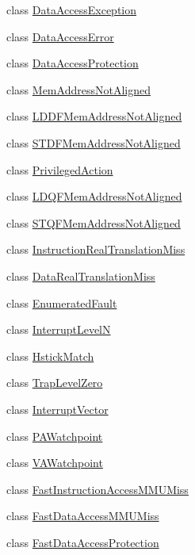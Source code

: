 \begin{DoxyCompactItemize}
\item 
class \hyperlink{classSparcISA_1_1DataAccessException}{DataAccessException}
\item 
class \hyperlink{classSparcISA_1_1DataAccessError}{DataAccessError}
\item 
class \hyperlink{classSparcISA_1_1DataAccessProtection}{DataAccessProtection}
\item 
class \hyperlink{classSparcISA_1_1MemAddressNotAligned}{MemAddressNotAligned}
\item 
class \hyperlink{classSparcISA_1_1LDDFMemAddressNotAligned}{LDDFMemAddressNotAligned}
\item 
class \hyperlink{classSparcISA_1_1STDFMemAddressNotAligned}{STDFMemAddressNotAligned}
\item 
class \hyperlink{classSparcISA_1_1PrivilegedAction}{PrivilegedAction}
\item 
class \hyperlink{classSparcISA_1_1LDQFMemAddressNotAligned}{LDQFMemAddressNotAligned}
\item 
class \hyperlink{classSparcISA_1_1STQFMemAddressNotAligned}{STQFMemAddressNotAligned}
\item 
class \hyperlink{classSparcISA_1_1InstructionRealTranslationMiss}{InstructionRealTranslationMiss}
\item 
class \hyperlink{classSparcISA_1_1DataRealTranslationMiss}{DataRealTranslationMiss}
\item 
class \hyperlink{classSparcISA_1_1EnumeratedFault}{EnumeratedFault}
\item 
class \hyperlink{classSparcISA_1_1InterruptLevelN}{InterruptLevelN}
\item 
class \hyperlink{classSparcISA_1_1HstickMatch}{HstickMatch}
\item 
class \hyperlink{classSparcISA_1_1TrapLevelZero}{TrapLevelZero}
\item 
class \hyperlink{classSparcISA_1_1InterruptVector}{InterruptVector}
\item 
class \hyperlink{classSparcISA_1_1PAWatchpoint}{PAWatchpoint}
\item 
class \hyperlink{classSparcISA_1_1VAWatchpoint}{VAWatchpoint}
\item 
class \hyperlink{classSparcISA_1_1FastInstructionAccessMMUMiss}{FastInstructionAccessMMUMiss}
\item 
class \hyperlink{classSparcISA_1_1FastDataAccessMMUMiss}{FastDataAccessMMUMiss}
\item 
class \hyperlink{classSparcISA_1_1FastDataAccessProtection}{FastDataAccessProtection}
\item 

\end{DoxyCompactItemize}
